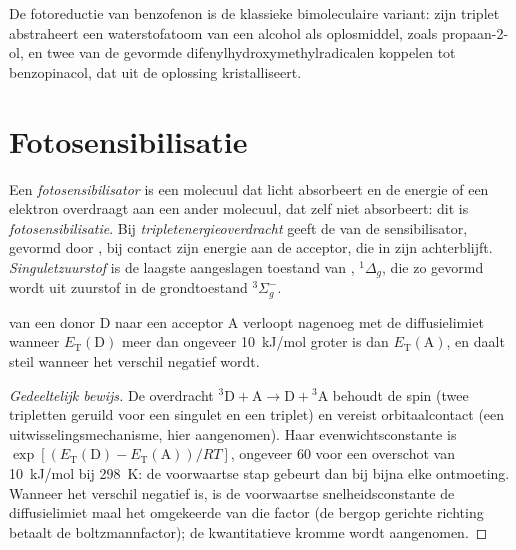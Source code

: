 De fotoreductie van benzofenon is de klassieke bimoleculaire variant: zijn
triplet abstraheert een waterstofatoom van een alcohol als oplosmiddel,
zoals propaan-2-ol, en twee van de gevormde
difenylhydroxymethylradicalen koppelen tot benzopinacol, dat uit de
oplossing kristalliseert.

\section{Fotosensibilisatie}

\begin{definition}\label{def:b3:photochemistry:sensitisation}
Een \emph{fotosensibilisator} is een molecuul
dat licht absorbeert en de energie of een elektron overdraagt aan een
ander molecuul, dat zelf niet absorbeert: dit is
\emph{fotosensibilisatie}. Bij
\emph{tripletenergieoverdracht} geeft de
 van de sensibilisator, gevormd door ,
bij contact zijn energie aan de acceptor, die in zijn 
achterblijft. \emph{Singuletzuurstof} is de
laagste aangeslagen toestand van ,
${}^1\Delta_g$, die zo gevormd wordt uit zuurstof in de grondtoestand ${}^3\Sigma_g^-$.
\end{definition}

\begin{proposition}\label{prop:b3:photochemistry:sensitisation-condition}
 van een donor D naar een acceptor A
verloopt nagenoeg met de diffusielimiet wanneer $E_{\mathrm T}(\mathrm D)$
meer dan ongeveer \qty{10}{kJ/mol} groter is dan $E_{\mathrm T}(\mathrm A)$, en
daalt steil wanneer het verschil negatief wordt.
\end{proposition}

\begin{proof}[Gedeeltelijk bewijs]
De overdracht ${}^3\mathrm D + \mathrm A \to \mathrm D + {}^3\mathrm A$
behoudt de spin (twee tripletten geruild voor een singulet en een triplet)
en vereist orbitaalcontact (een uitwisselingsmechanisme, hier
aangenomen). Haar evenwichtsconstante is $\exp[(E_{\mathrm T}(\mathrm D) - E_{\mathrm T}(\mathrm A))/RT]$, ongeveer 60 voor een
overschot van \qty{10}{kJ/mol} bij \qty{298}{K}: de voorwaartse stap
gebeurt dan bij bijna elke ontmoeting. Wanneer het verschil negatief is,
is de voorwaartse snelheidsconstante de diffusielimiet maal het omgekeerde
van die factor (de bergop gerichte richting betaalt de boltzmannfactor);
de kwantitatieve kromme wordt aangenomen.
\end{proof}

